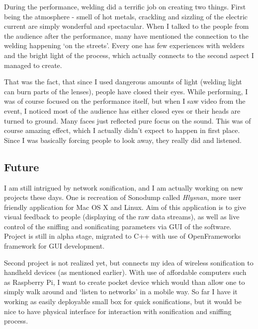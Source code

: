 \documentclass[12pt,a4paper,oneside]{report}
\begin{document}
During the performance, welding did a terrific job on creating two things. First being the atmosphere - smell of hot metals, crackling and sizzling of the electric current are simply wonderful and spectacular. When I talked to the people from the audience after the performance, many have mentioned the connection to the welding happening `on the streets'. Every one has few experiences with welders and the bright light of the process, which actually connects to the second aspect I managed to create. 

That was the fact, that since I used dangerous amounts of light (welding light can burn parts of the lenses), people have closed their eyes. While performing, I was of course focused on the performance itself, but when I saw video from the event, I noticed most of the audience has either closed eyes or their heads are turned to ground. Many faces just reflected pure focus on the sound. This was of course amazing effect, which I actually didn't expect to happen in first place. Since I was basically forcing people to look away, they really did and listened.

\subsection{Future}
I am still intrigued by network sonification, and I am actually working on new projects these days. One is recreation of Sonodump called \textit{Hlysnan}, more user friendly application for Mac OS X and Linux. Aim of this application is to give visual feedback to people (displaying of the raw data streams), as well as live control of the sniffing and sonificating parameters via GUI of the software. Project is still in alpha stage, migrated to C++ with use of OpenFrameworks framework for GUI development.

Second project is not realized yet, but connects my idea of wireless sonification to handheld devices (as mentioned earlier). With use of affordable computers such as Raspberry Pi, I want to create pocket device which would than allow one to simply walk around and `listen to networks' in a mobile way. So far I have it working as easily deployable small box for quick sonifications, but it would be nice to have physical interface for interaction with sonification and sniffing process.
\end{document}
